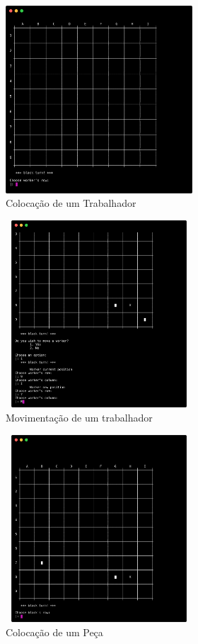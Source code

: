 \documentclass[a4paper]{article}
\begin{document}
\begin{figure}[h!]
\begin{center}
\includegraphics[height=7cm,width=7cm]{images/fabrik_choose_worker.png}
\caption{Colocação de um Trabalhador}
\label{Figura 1}
\end{center}
\end{figure}

\begin{figure}[h!]
\begin{center}
\includegraphics[height=7cm,width=7cm]{images/fabrik_change_worker_pos.png}
\caption{Movimentação de um trabalhador}
\label{Figura 1}
\end{center}
\end{figure}

\begin{figure}[h!]
\begin{center}
\includegraphics[height=7cm,width=7cm]{images/fabrik_set_piece.png}
\caption{Colocação de um Peça}
\label{Figura 1}
\end{center}
\end{figure}
\end{document}
